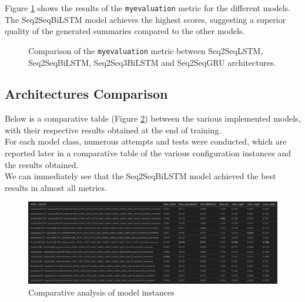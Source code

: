 Figure \ref{fig:myevaluation_comparison} shows the results of the \texttt{myevaluation} metric for the different models.\\
The Seq2SeqBiLSTM model achieves the highest scores, suggesting a superior quality of the generated summaries compared to the other models.
\begin{figure}[H]
    \centering
    \hfill
    \hfill
    \hfill
    \hfill

    \caption{Comparison of the \texttt{myevaluation} metric between Seq2SeqLSTM, Seq2SeqBiLSTM, Seq2Seq3BiLSTM and Seq2SeqGRU architectures.}
    \label{fig:myevaluation_comparison}
\end{figure}

\subsection{Architectures Comparison}
Below is a comparative table (Figure \ref{fig:models_comparison_instances}) between the various implemented models, with their respective results obtained at the end of training.\\
For each model class, numerous attempts and tests were conducted, which are reported later in a comparative table of the various configuration instances and the results obtained.\\
We can immediately see that the Seq2SeqBiLSTM model achieved the best results in almost all metrics.
\begin{figure}[H]
    \centering
    \includegraphics[width=1\textwidth]{media/models_comparison_instances.png}
    \caption{Comparative analysis of model instances}
    \label{fig:models_comparison_instances}
\end{figure}

